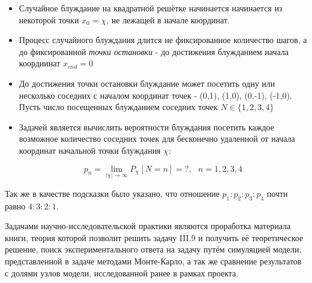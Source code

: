 \begin{itemize}
    \item Случайное блуждание на квадратной решётке начинается начинается из некоторой точки $x_0 = \chi$, не лежащей в начале координат.
    \item Процесс случайного блуждания длится не фиксированное количество шагов, а до фиксированной \textit{точки остановки} - до достижения блужданием начала коордиинат $x_{end} = 0$
    \item До достижения точки остановки блуждание может посетить одну или несколько соседних с началом координат точек - (0,1), (1,0), (0,-1), (-1,0). Пусть число посещенных блужданием соседних точек  $N \in \{1, 2, 3, 4\}$
    \item Задачей является вычислить вероятности блуждания посетить каждое возможное количество соседних точек для бесконечно удаленной от начала координат начальной точки блуждания $\chi$:
    
    \[ p_{n} = \lim_{|\chi|\to \infty} P_{\chi}[N = n] = ?,\ \ \ n = 1, 2, 3, 4\]
\end{itemize}

Так же в качестве подсказки было указано, что отношение $p_1:p_2:p_3:p_4$ почти равно $4:3:2:1$.

Задачами научно-исследовательской практики являются проработка материала книги, теория которой позволит решить задачу III.9 и получить её теоретическое решение, поиск экспериментального ответа на задачу путём симуляцией модели, представленной в задаче методами Монте-Карло, а так же сравнение результатов с долями узлов модели, исследованной ранее в рамках проекта.